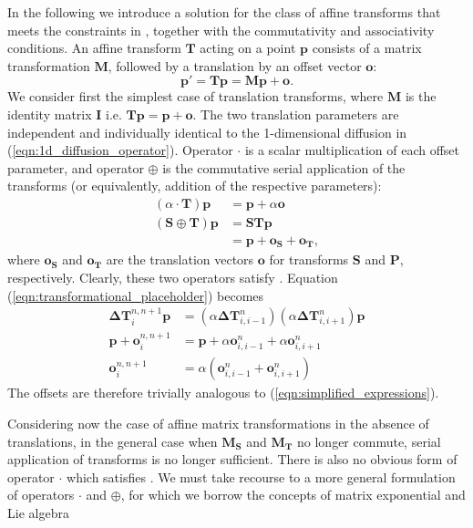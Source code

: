 	  In the following we introduce a solution for the class of affine transforms that meets the constraints in  , together with the commutativity and associativity conditions. An affine transform $\mathbf{T}$ acting on a point $\mathbf{p}$ consists of a matrix transformation $\mathbf{M}$, followed by a translation by an offset vector $\mathbf{o}$:
		\begin{equation}
			\mathbf{p'} = \mathbf{Tp}= \mathbf{Mp} + \mathbf{o}.
		\end{equation}
		We consider first the simplest case of translation transforms, where $\mathbf{M}$ is the identity matrix $\mathbf{I}$ i.e. $\mathbf{Tp} = \mathbf{p} + \mathbf{o}$. The two translation parameters are independent and individually identical to the 1-dimensional diffusion in (\ref{eqn:1d_diffusion_operator}). Operator $\cdot$ is a scalar multiplication of each offset parameter, and operator $\oplus$ is the commutative serial application of the transforms (or equivalently, addition of the respective parameters):
		\begin{align}
			(\alpha \cdot \mathbf{T}) \mathbf{p} &= \mathbf{p} + \alpha\mathbf{o} \label{eqn:translation_cdot}\\
			(\mathbf{S} \oplus \mathbf{T}) \mathbf{p} &= \mathbf{STp} \\
			                                          &= \mathbf{p} + \mathbf{o_S} + \mathbf{o_T} \label{eqn:translation_oplus},
		\end{align}
    where $\mathbf{o_S}$ and $\mathbf{o_T}$ are the translation vectors $\mathbf{o}$ for transforms $\mathbf{S}$ and $\mathbf{P}$, respectively. Clearly, these two operators satisfy . Equation (\ref{eqn:transformational_placeholder}) becomes
		\begin{align}
		 	\mathbf{\Delta T}_i^{n,n+1} \mathbf{p} &= (\alpha \mathbf{\Delta T}_{i,i-1}^n) (\alpha \mathbf{\Delta T}_{i,i+1}^n) \mathbf{p} \\
			\mathbf{p} + \mathbf{o}_i^{n,n+1} &= \mathbf{p} + \alpha \mathbf{o}_{i,i-1}^n + \alpha \mathbf{o}_{i,i+1}^n \\
			\mathbf{o}_i^{n,n+1} &= \alpha (\mathbf{o}_{i,i-1}^n + \mathbf{o}_{i,i+1}^n) 
		\end{align}
		The offsets are therefore trivially analogous to (\ref{eqn:simplified_expressions}).
				
		Considering now the case of affine matrix transformations in the absence of translations, in the general case when $\mathbf{M_S}$ and $\mathbf{M_T}$ no longer commute, serial application of transforms is no longer sufficient. There is also no obvious form of operator $\cdot$ which satisfies . We must take recourse to a more general formulation of operators $\cdot$ and $\oplus$, for which we borrow the concepts of matrix exponential and Lie algebra \cite{Arsigny2005, Arsigny2005a}

